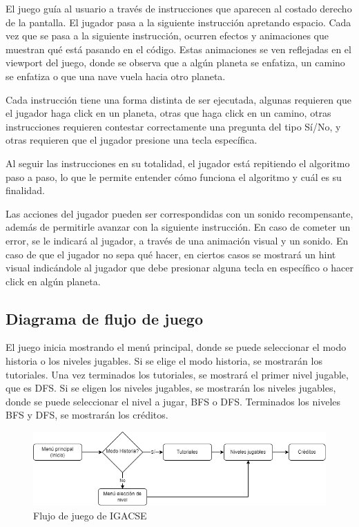 El juego guía al usuario a través de instrucciones que aparecen al costado derecho de la pantalla. El jugador pasa a la siguiente instrucción apretando espacio. Cada vez que se pasa a la siguiente instrucción, ocurren efectos y animaciones que muestran qué está pasando en el código. Estas animaciones se ven reflejadas en el viewport del juego, donde se observa que a algún planeta se enfatiza, un camino se enfatiza o que una nave vuela hacia otro planeta.

Cada instrucción tiene una forma distinta de ser ejecutada, algunas requieren que el jugador haga click en un planeta, otras que haga click en un camino, otras instrucciones requieren contestar correctamente una pregunta del tipo Sí/No, y otras requieren que el jugador presione una tecla específica.

Al seguir las instrucciones en su totalidad, el jugador está repitiendo el algoritmo paso a paso, lo que le permite entender cómo funciona el algoritmo y cuál es su finalidad.

Las acciones del jugador pueden ser correspondidas con un sonido recompensante, además de permitirle avanzar con la siguiente instrucción. En caso de cometer un error, se le indicará al jugador, a través de una animación visual y un sonido. En caso de que el jugador no sepa qué hacer, en ciertos casos se mostrará un hint visual indicándole al jugador que debe presionar alguna tecla en específico o hacer click en algún planeta.


\subsection{Diagrama de flujo de juego}

El juego inicia mostrando el menú principal, donde se puede seleccionar el modo historia o los niveles jugables.
Si se elige el modo historia, se mostrarán los tutoriales. Una vez terminados los tutoriales, se mostrará el primer nivel jugable, que es DFS.
Si se eligen los niveles jugables, se mostrarán los niveles jugables, donde se puede seleccionar el nivel a jugar, BFS o DFS.
Terminados los niveles BFS y DFS, se mostrarán los créditos.

\begin{figure}[h]
	\centering
	\includegraphics[scale=.5]{imagenes/FlujoDeJuego.png}
	\caption{ Flujo de juego de IGACSE}
	\label{FlujoDeJuego}
\end{figure}


